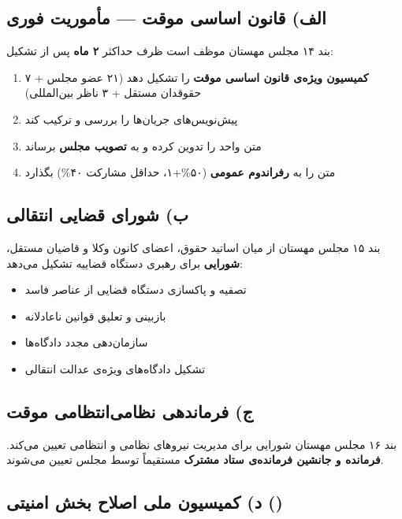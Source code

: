 \subsection{الف) قانون اساسی موقت --- مأموریت فوری}

\begin{bandbox}{بند ۱۴}
	مجلس مهستان موظف است ظرف حداکثر \textbf{۲ ماه} پس از تشکیل:
	\begin{enumerate}
		\item \textbf{کمیسیون ویژه‌ی قانون اساسی موقت} را تشکیل دهد (۲۱ عضو مجلس + ۷ حقوقدان مستقل + ۳ ناظر بین‌المللی)
		\item پیش‌نویس‌های جریان‌ها را بررسی و ترکیب کند
		\item متن واحد را تدوین کرده و به \textbf{تصویب  مجلس} برساند
		\item متن را به \textbf{رفراندوم عمومی} (۵۰\%+۱، حداقل مشارکت ۴۰\%) بگذارد
	\end{enumerate}
\end{bandbox}

\subsection{ب) شورای قضایی انتقالی}

\begin{bandbox}{بند ۱۵}
	مجلس مهستان از میان اساتید حقوق، اعضای کانون وکلا و قاضیان مستقل، \textbf{شورایی}
	برای رهبری دستگاه قضاییه تشکیل می‌دهد:
	\begin{itemize}
		\item تصفیه و پاکسازی دستگاه قضایی از عناصر فاسد
		\item بازبینی و تعلیق قوانین ناعادلانه
		\item سازمان‌دهی مجدد دادگاه‌ها
		\item تشکیل دادگاه‌های ویژه‌ی عدالت انتقالی
	\end{itemize}
\end{bandbox}

\subsection{ج) فرماندهی نظامی‌انتظامی موقت}

\begin{bandbox}{بند ۱۶}
	مجلس مهستان شورایی برای مدیریت نیروهای نظامی و انتظامی تعیین می‌کند.
	\textbf{فرمانده و جانشین فرمانده‌ی ستاد مشترک} مستقیماً توسط مجلس تعیین می‌شوند.
\end{bandbox}

\subsection{د) کمیسیون ملی اصلاح بخش امنیتی ()}

